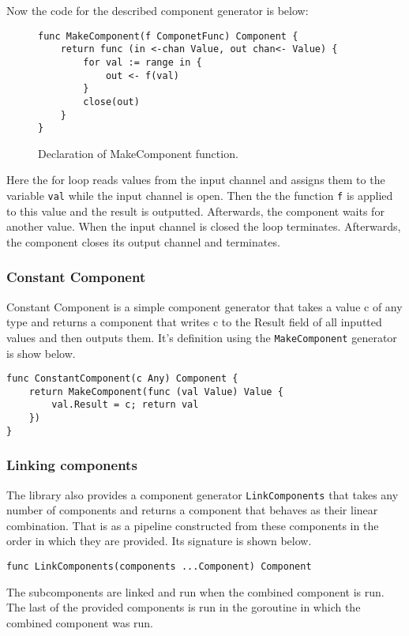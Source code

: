 \documentclass[12pt,a4paper]{article}
\begin{document}
Now the code for the described component generator is below:
\begin{figure}[h]
\centering
\begin{lstlisting}
func MakeComponent(f ComponetFunc) Component {
    return func (in <-chan Value, out chan<- Value) {
        for val := range in {
            out <- f(val)
        }
        close(out)
    }
}
\end{lstlisting}
\caption[scale=1.0]{Declaration of MakeComponent function.}
\label{fig:MakeComponent}
\end{figure}

Here the for loop reads values from the input channel and assigns them
to the variable \texttt{val} while the input channel is open. Then the 
the function \texttt{f} is applied to this value and the result is outputted.
Afterwards, the component waits for another value. When the input channel
is closed the loop terminates. Afterwards, the component closes its output channel
and terminates.

\subsubsection{Constant Component}
Constant Component is a simple component generator that takes a value c
of any type and returns a component that writes c to the Result field of 
all inputted values and then outputs them. It's definition using the 
\texttt{MakeComponent} generator is show below.
\begin{lstlisting}
func ConstantComponent(c Any) Component {
    return MakeComponent(func (val Value) Value {
        val.Result = c; return val
    })
}
\end{lstlisting}

\subsubsection{Linking components}
The library also provides a component generator \texttt{LinkComponents} that takes 
any number of components and returns a component that behaves as their 
linear combination. That is as a pipeline constructed from these components 
in the order in which they are provided. Its signature is shown below.
\begin{lstlisting}
func LinkComponents(components ...Component) Component
\end{lstlisting}
The subcomponents are linked and run when the combined component is run. 
The last of the provided components is run in the goroutine in which
the combined component was run.
\end{document}
